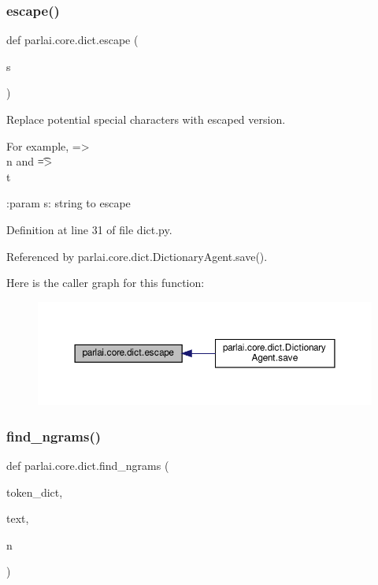 \subsubsection{\texorpdfstring{escape()}{escape()}}
{\footnotesize\ttfamily def parlai.\+core.\+dict.\+escape (\begin{DoxyParamCaption}\item[{}]{s }\end{DoxyParamCaption})}

\begin{DoxyVerb}Replace potential special characters with escaped version.

For example, \n => \\n and \t => \\t

:param s:
    string to escape
\end{DoxyVerb}
 

Definition at line 31 of file dict.\+py.



Referenced by parlai.\+core.\+dict.\+Dictionary\+Agent.\+save().

Here is the caller graph for this function\+:
\nopagebreak
\begin{figure}[H]
\begin{center}
\leavevmode
\includegraphics[width=350pt]{namespaceparlai_1_1core_1_1dict_ae44fe4a2be005a4023a758a58f656495_icgraph}
\end{center}
\end{figure}
\mbox{\label{namespaceparlai_1_1core_1_1dict_a5e9eb43b6c0dce0b3aab7f3ea3717de6}} 
\subsubsection{\texorpdfstring{find\+\_\+ngrams()}{find\_ngrams()}}
{\footnotesize\ttfamily def parlai.\+core.\+dict.\+find\+\_\+ngrams (\begin{DoxyParamCaption}\item[{}]{token\+\_\+dict,  }\item[{}]{text,  }\item[{}]{n }\end{DoxyParamCaption})}

